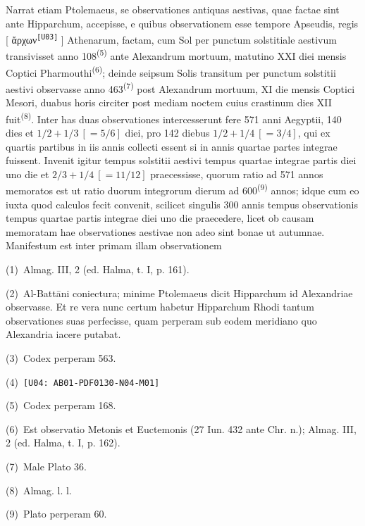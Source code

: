 \documentclass[10pt,a4paper]{article}
\newcommand{\A}[1]{\hypertarget{#1}{}}
\newcommand{\NM}[1]{\textsuperscript{(#1)}}
\newcommand{\NN}[2]{%
  \par\noindent\textup{(#1)}\ #2%
}
\newcommand{\U}[2]{%
  #2\textsuperscript{\texttt{[#1]}}%
}
\begin{document}
\A{AB01-PDF0130-P03}
Narrat etiam Ptolemaeus, se observationes antiquas aestivas, quae
factae sint ante Hipparchum, accepisse, e quibus observationem esse
tempore Apseudis, regis [\U{U03}{ἄρχων}] Athenarum, factam, cum Sol
per punctum solstitiale aestivum transivisset anno 108\NM{5} ante
Alexandrum mortuum, matutino XXI diei mensis Coptici
Pharmouthi\NM{6}; deinde seipsum Solis transitum per punctum
solstitii aestivi observasse anno 463\NM{7} post Alexandrum
mortuum, XI die mensis Coptici Mesori, duabus horis circiter post
mediam noctem cuius crastinum dies XII fuit\NM{8}. Inter has duas
observationes intercesserunt fere 571 anni Aegyptii, 140 dies et
$1/2+1/3\ [=5/6]$ diei, pro 142 diebus $1/2+1/4\ [=3/4]$, qui ex
quartis partibus in iis annis collecti essent si in annis quartae
partes integrae fuissent. Invenit igitur tempus solstitii aestivi
tempus quartae integrae partis diei uno die et
$2/3+1/4\ [=11/12]$ praecessisse, quorum ratio ad 571 annos
memoratos est ut ratio duorum integrorum dierum ad 600\NM{9}
annos; idque cum eo iuxta quod calculos fecit convenit, scilicet
singulis 300 annis tempus observationis tempus quartae partis
integrae diei uno die praecedere, licet ob causam memoratam hae
observationes aestivae non adeo sint bonae ut autumnae. Manifestum
est inter primam illam observationem

\begin{multicols}{2}
\footnotesize

\A{AB01-PDF0130-N01}
\NN{1}{Almag. III, 2 (ed. Halma, t. I, p. 161).}

\A{AB01-PDF0130-N02}
\NN{2}{Al-Battāni coniectura; minime Ptolemaeus dicit Hipparchum
id Alexandriae observasse. Et re vera nunc certum habetur
Hipparchum Rhodi tantum observationes suas perfecisse, quam
perperam sub eodem meridiano quo Alexandria iacere putabat.}

\A{AB01-PDF0130-N03}
\NN{3}{Codex perperam 563.}

\A{AB01-PDF0130-N04}
\NN{4}{\texttt{[U04: AB01-PDF0130-N04-M01]}}

\A{AB01-PDF0130-N05}
\NN{5}{Codex perperam 168.}

\A{AB01-PDF0130-N06}
\NN{6}{Est observatio Metonis et Euctemonis
(27 Iun. 432 ante Chr. n.); Almag. III, 2
(ed. Halma, t. I, p. 162).}

\A{AB01-PDF0130-N07}
\NN{7}{Male Plato 36.}

\A{AB01-PDF0130-N08}
\NN{8}{Almag. l. l.}

\A{AB01-PDF0130-N09}
\NN{9}{Plato perperam 60.}

\end{multicols}
\end{document}

